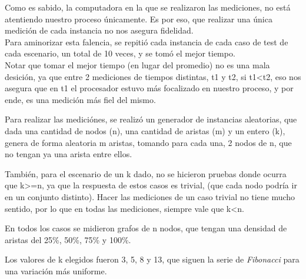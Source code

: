 \documentclass[10pt,a4paper]{article}
\begin{document}
Como es sabido, la computadora en la que se realizaron las mediciones, no está atentiendo nuestro proceso únicamente. Es por eso, que realizar una única medición de cada instancia no nos asegura fidelidad.\\
\indent Para aminorizar esta falencia, se repitió cada instancia de cada caso de test de cada escenario, un total de 10 veces, y se tomó el mejor tiempo.\\
Notar que tomar el mejor tiempo (en lugar del promedio) no es una mala desición, ya que entre 2 mediciones de tiempos distintas, t1 y t2, si t1\textless t2, eso nos asegura que en t1 el procesador estuvo más focalizado en nuestro proceso, y por ende, es una medición más fiel del mismo.

Para realizar las mediciónes, se realizó un generador de instancias aleatorias, que dada una cantidad de nodos (n), una cantidad de aristas (m) y un entero (k), genera de forma aleatoria m aristas, tomando para cada una, 2 nodos de n, que no tengan ya una arista entre ellos.

También, para el escenario de un k dado, no se hicieron pruebas donde ocurra que k\textgreater =n, ya que la respuesta de estos casos es trivial, (que cada nodo podría ir en un conjunto distinto). Hacer las mediciones de un caso trivial no tiene mucho sentido, por lo que en todas las mediciones, siempre vale que k\textless n.

En todos los casos se midieron grafos de n nodos, que tengan una densidad de aristas del 25\%, 50\%, 75\% y 100\%.

Los valores de k elegidos fueron 3, 5, 8 y 13, que siguen la serie de \textit{Fibonacci} para una variación más uniforme.\\
\end{document}
